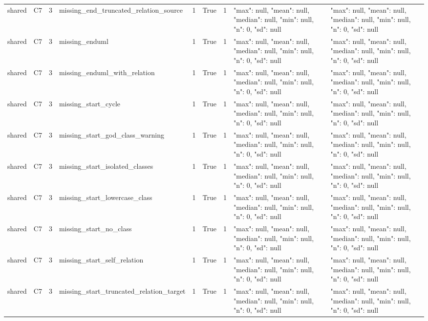 \begin{tabular}{lllllllll}
shared & C7 & 3 & missing\_end\_truncated\_relation\_source & 1 & True & 1 & {"max": null, "mean": null, "median": null, "min": null, "n": 0, "sd": null} & {"max": null, "mean": null, "median": null, "min": null, "n": 0, "sd": null} \\
shared & C7 & 3 & missing\_enduml & 1 & True & 1 & {"max": null, "mean": null, "median": null, "min": null, "n": 0, "sd": null} & {"max": null, "mean": null, "median": null, "min": null, "n": 0, "sd": null} \\
shared & C7 & 3 & missing\_enduml\_with\_relation & 1 & True & 1 & {"max": null, "mean": null, "median": null, "min": null, "n": 0, "sd": null} & {"max": null, "mean": null, "median": null, "min": null, "n": 0, "sd": null} \\
shared & C7 & 3 & missing\_start\_cycle & 1 & True & 1 & {"max": null, "mean": null, "median": null, "min": null, "n": 0, "sd": null} & {"max": null, "mean": null, "median": null, "min": null, "n": 0, "sd": null} \\
shared & C7 & 3 & missing\_start\_god\_class\_warning & 1 & True & 1 & {"max": null, "mean": null, "median": null, "min": null, "n": 0, "sd": null} & {"max": null, "mean": null, "median": null, "min": null, "n": 0, "sd": null} \\
shared & C7 & 3 & missing\_start\_isolated\_classes & 1 & True & 1 & {"max": null, "mean": null, "median": null, "min": null, "n": 0, "sd": null} & {"max": null, "mean": null, "median": null, "min": null, "n": 0, "sd": null} \\
shared & C7 & 3 & missing\_start\_lowercase\_class & 1 & True & 1 & {"max": null, "mean": null, "median": null, "min": null, "n": 0, "sd": null} & {"max": null, "mean": null, "median": null, "min": null, "n": 0, "sd": null} \\
shared & C7 & 3 & missing\_start\_no\_class & 1 & True & 1 & {"max": null, "mean": null, "median": null, "min": null, "n": 0, "sd": null} & {"max": null, "mean": null, "median": null, "min": null, "n": 0, "sd": null} \\
shared & C7 & 3 & missing\_start\_self\_relation & 1 & True & 1 & {"max": null, "mean": null, "median": null, "min": null, "n": 0, "sd": null} & {"max": null, "mean": null, "median": null, "min": null, "n": 0, "sd": null} \\
shared & C7 & 3 & missing\_start\_truncated\_relation\_target & 1 & True & 1 & {"max": null, "mean": null, "median": null, "min": null, "n": 0, "sd": null} & {"max": null, "mean": null, "median": null, "min": null, "n": 0, "sd": null} \\

\end{tabular}
